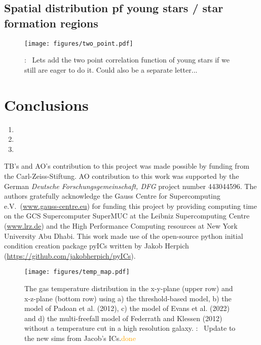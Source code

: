 \documentclass{aa}
\newcommand{\T}[1]{{\color{blue}{\bf T}:~ #1}}
\begin{document}
\subsection{Spatial distribution pf young stars / star formation regions}

\begin{figure*}
\begin{center}
    \texttt{[image: figures/two\_point.pdf]}
    \caption{ \T{Lets add the two point correlation function of young stars if we still are eager to do it. Could also be a separate letter...}}
\end{center}
\end{figure*}



\section{Conclusions}

   \begin{enumerate}
      \item 
      \item 
      \item 
   \end{enumerate}

\begin{acknowledgements}
      TB’s and AO's contribution to this project was made possible by funding from the Carl-Zeiss-Stiftung.
      AO contribution to this work was supported by the German \emph{Deut\-sche For\-schungs\-ge\-mein\-schaft, DFG\/} project number 443044596.
      The authors  gratefully acknowledge the Gauss Centre for Supercomputing e.V.\ (\url{www.gauss-centre.eu}) for funding this project by providing computing time on the GCS Supercomputer SuperMUC at the Leibniz Supercomputing Centre (\url{www.lrz.de}) and the High Performance Computing resources at New York University Abu Dhabi.
      This work made use of the open-source python initial condition creation package {\sc pyICs} written by Jakob Herpich (\url{https://github.com/jakobherpich/pyICs}).
\end{acknowledgements}




\begin{figure*}
\begin{center}
    \texttt{[image: figures/temp\_map.pdf]}
    \caption{The gas temperature distribution in the x-y-plane (upper row) and x-z-plane (bottom row) using a) the
threshold-based model, b) the model of Padoan et al. (2012), c) the model of Evans et al. (2022) and d) the multi-freefall model of Federrath and Klessen (2012) without a temperature cut in a high resolution galaxy. \T{Update to the new sims from Jacob's ICs.}\textcolor{orange}{done}
}
\end{center}
\end{figure*}
\end{document}
